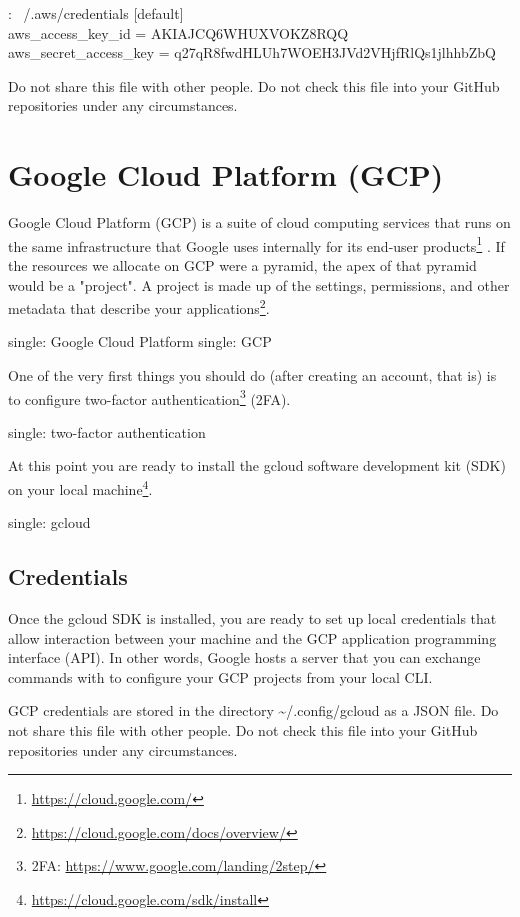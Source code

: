 \begin{mybox}{\thetcbcounter: ~/.aws/credentials}
  [default]\\
  aws\_access\_key\_id = AKIAJCQ6WHUXVOKZ8RQQ\\
  aws\_secret\_access\_key = q27qR8fwdHLUh7WOEH3JVd2VHjfRlQs1jlhhbZbQ\\
\end{mybox}

\justify
Do not share this file with other people. Do not check this file into
your GitHub repositories under any circumstances.

\section{Google Cloud Platform (GCP)}

\justify
Google Cloud Platform (GCP) is a suite of cloud computing services that
runs on the same infrastructure that Google uses internally for its
end-user products\footnote{\url{https://cloud.google.com/}} . If the
resources we allocate on GCP were a pyramid, the apex of that pyramid
would be a "project". A project is made up of the settings, permissions,
and other metadata that describe your applications\footnote{\url{https://cloud.google.com/docs/overview/}}.

single: Google Cloud Platform single: GCP

\justify
One of the very first things you should do (after creating an account,
that is) is to configure two-factor authentication\footnote{2FA:
  \url{https://www.google.com/landing/2step/}} (2FA).

single: two-factor authentication

\justify
At this point you are ready to install the gcloud software development
kit (SDK) on your local machine\footnote{\url{https://cloud.google.com/sdk/install}}.

single: gcloud

\subsection{Credentials}

\justify
Once the gcloud SDK is installed, you are ready to set up local
credentials that allow interaction between your machine and the GCP
application programming interface (API). In other words, Google hosts a
server that you can exchange commands with to configure your GCP
projects from your local CLI.

\justify
GCP credentials are stored in the directory
\textasciitilde{}/.config/gcloud as a JSON file. Do not share this file
with other people. Do not check this file into your GitHub repositories
under any circumstances.


